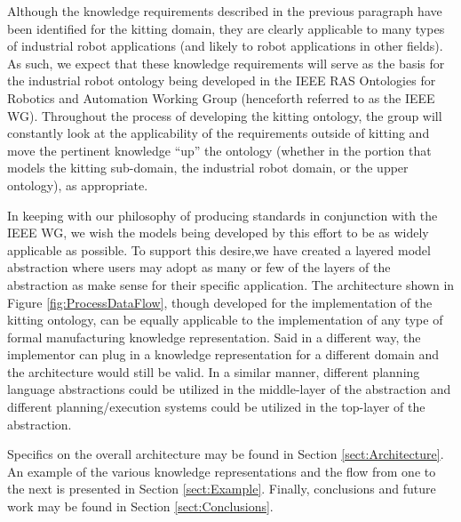 Although the knowledge requirements described in the previous paragraph have been identified for the kitting domain, they are clearly applicable to many types of industrial robot applications (and likely to robot applications in other fields). As such, we expect that these knowledge requirements will serve as the basis for the industrial robot ontology being developed in the IEEE  RAS Ontologies for Robotics and Automation Working Group \cite{Madhavan2011} (henceforth referred to as the IEEE WG). Throughout the process of developing the kitting ontology, the group will constantly look at the applicability of the requirements outside of kitting and move the pertinent knowledge ``up'' the ontology (whether in the portion that models the kitting sub-domain, the industrial robot domain, or the upper ontology), as appropriate.

In keeping with our philosophy of producing standards in conjunction with the IEEE WG, we wish the models being developed by this effort to be as widely applicable as possible. To support this desire,we have
created a layered model abstraction where users may adopt as many or few of the layers of the abstraction as make sense for their
specific application.  The architecture shown in Figure \ref{fig:ProcessDataFlow}, though developed for the implementation of the kitting ontology, can be equally applicable to the implementation of any type of formal manufacturing knowledge representation. Said in a different way, the implementor can plug in a knowledge representation for a different domain and the architecture would still be valid. In a similar manner, different planning language abstractions could be utilized in the middle-layer of the
abstraction and different planning/execution systems could be utilized in the top-layer of the abstraction.

Specifics on the overall architecture may be found in Section \ref{sect:Architecture}. An example of the
various knowledge representations and the flow from one to the next is presented in Section \ref{sect:Example}. Finally,
conclusions and future work may be found in Section \ref{sect:Conclusions}.

